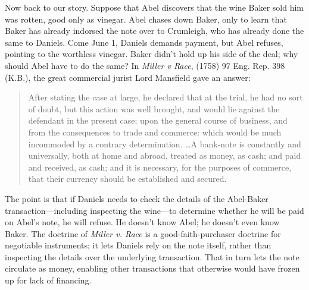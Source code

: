 Now back to our story. Suppose that Abel discovers that the wine Baker sold him
was rotten, good only as vinegar. Abel chases down Baker, only to learn that
Baker has already indorsed the note over to Crumleigh, who has already done the
same to Daniels. Come June 1, Daniels demands payment, but Abel refuses,
pointing to the worthless vinegar. Baker didn't hold up his side of the deal;
why should Abel have to do the same? In \textit{Miller v Race}, (1758) 97 Eng.
Rep. 398 (K.B.), the great commercial jurist Lord Mansfield gave an answer:
\begin{quote}
After stating the case at large, he declared that at the trial, he had no sort
of doubt, but this action was well brought, and would lie against the defendant
in the present case; upon the general course of business, and from the
consequences to trade and commerce: which would be much incommoded by a
contrary determination. \ldots A bank-note is constantly and universally, both
at home and abroad, treated as money, as cash; and paid and received, as cash;
and it is necessary, for the purposes of commerce, that their currency should
be established and secured.
\end{quote}
The point is that if Daniels needs to check the details of the Abel-Baker
transaction---including inspecting the wine---to determine whether he will be
paid on Abel's note, he will refuse. He doesn't know Abel; he doesn't even know
Baker. The doctrine of \textit{Miller v. Race} is a good-faith-purchaser
doctrine for negotiable instruments; it lets Daniels rely on the note itself,
rather than inspecting the details over the underlying transaction. That in
turn lets the note circulate as money, enabling other transactions that
otherwise would have frozen up for lack of financing.

